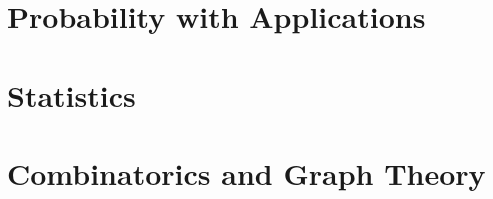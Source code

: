 \chapter{Probability with Applications}\label{cha:prob-with-appl}

\chapter{Statistics}\label{cha:statistics}

\chapter{Combinatorics and Graph Theory}\label{cha:comb-graph-theory}

